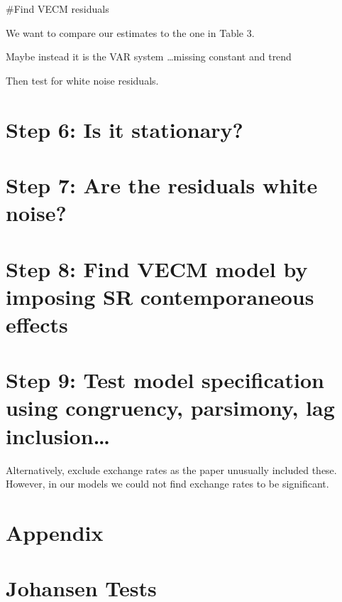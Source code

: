 \documentclass[11pt,preprint, authoryear]{elsarticle}
\numberwithin{equation}{section}
\numberwithin{figure}{section}
\numberwithin{table}{section}
\begin{document}
\#Find VECM residuals

We want to compare our estimates to the one in Table 3.

Maybe instead it is the VAR system \ldots missing constant and trend

Then test for white noise residuals.

\hypertarget{step-6-is-it-stationary}{%
\section{Step 6: Is it stationary?}\label{step-6-is-it-stationary}}

\hypertarget{step-7-are-the-residuals-white-noise}{%
\section{Step 7: Are the residuals white
noise?}\label{step-7-are-the-residuals-white-noise}}

\hypertarget{step-8-find-vecm-model-by-imposing-sr-contemporaneous-effects}{%
\section{Step 8: Find VECM model by imposing SR contemporaneous
effects}\label{step-8-find-vecm-model-by-imposing-sr-contemporaneous-effects}}

\hypertarget{step-9-test-model-specification-using-congruency-parsimony-lag-inclusion}{%
\section{Step 9: Test model specification using congruency, parsimony,
lag
inclusion\ldots{}}\label{step-9-test-model-specification-using-congruency-parsimony-lag-inclusion}}

Alternatively, exclude exchange rates as the paper unusually included
these. However, in our models we could not find exchange rates to be
significant.

\hypertarget{appendix}{%
\section*{Appendix}\label{appendix}}

\hypertarget{johansen-tests}{%
\section*{Johansen Tests}\label{johansen-tests}}


\end{document}
